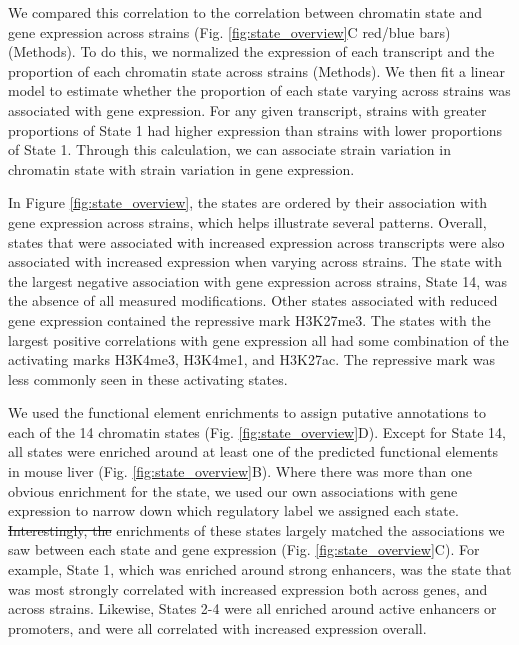 \documentclass[
  11pt,
]{article}
\providecommand{\DIFaddtex}[1]{{\protect\color{blue}\uwave{#1}}} %
\providecommand{\DIFdeltex}[1]{{\protect\color{red}\sout{#1}}}                      %
\providecommand{\DIFaddbegin}{} %
\providecommand{\DIFaddend}{} %
\providecommand{\DIFdelbegin}{} %
\providecommand{\DIFdelend}{} %
\providecommand{\DIFadd}[1]{\texorpdfstring{\DIFaddtex{#1}}{#1}} %
\providecommand{\DIFdel}[1]{\texorpdfstring{\DIFdeltex{#1}}{}} %
\newcommand{\DIFscaledelfig}{0.5}
\newlength{\DIFdelgraphicswidth} %
\newlength{\DIFdelgraphicsheight} %
\newcommand{\DIFaddincludegraphics}[2][]{{\color{blue}\fbox{\DIFOincludegraphics[#1]{#2}}}} %
\newcommand{\DIFdelincludegraphics}[2][]{%
\sbox{\DIFdelgraphicsbox}{\DIFOincludegraphics[#1]{#2}}%
\settoboxwidth{\DIFdelgraphicswidth}{\DIFdelgraphicsbox} %
\settoboxtotalheight{\DIFdelgraphicsheight}{\DIFdelgraphicsbox} %
\scalebox{\DIFscaledelfig}{%
\parbox[b]{\DIFdelgraphicswidth}{\usebox{\DIFdelgraphicsbox}\\[-\baselineskip] \rule{\DIFdelgraphicswidth}{0em}}\llap{\resizebox{\DIFdelgraphicswidth}{\DIFdelgraphicsheight}{%
\setlength{\unitlength}{\DIFdelgraphicswidth}%
\begin{picture}(1,1)%
\thicklines\linethickness{2pt} %
{\color[rgb]{1,0,0}\put(0,0){\framebox(1,1){}}}%
{\color[rgb]{1,0,0}\put(0,0){\line( 1,1){1}}}%
{\color[rgb]{1,0,0}\put(0,1){\line(1,-1){1}}}%
\end{picture}%
}\hspace*{3pt}}} %
} %
\DeclareRobustCommand{\DIFaddbegin}{\DIFOaddbegin \let\includegraphics\DIFaddincludegraphics} %
\DeclareRobustCommand{\DIFaddend}{\DIFOaddend \let\includegraphics\DIFOincludegraphics} %
\DeclareRobustCommand{\DIFdelbegin}{\DIFOdelbegin \let\includegraphics\DIFdelincludegraphics} %
\DeclareRobustCommand{\DIFdelend}{\DIFOaddend \let\includegraphics\DIFOincludegraphics} %
\begin{document}
We compared this correlation to the correlation between chromatin state
and gene expression across strains (Fig. \ref{fig:state_overview}C
red/blue bars) (Methods). To do this, we normalized the expression of
each transcript and the proportion of each chromatin state across
strains (Methods). We then fit a linear model to estimate whether the
proportion of each state varying across strains was associated with gene
expression. For any given transcript, strains with greater proportions
of State 1 had higher expression than strains with lower proportions of
State 1. Through this calculation, we can associate strain variation in
chromatin state with strain variation in gene expression.

In Figure \ref{fig:state_overview}, the states are ordered by their
association with gene expression across strains, which helps illustrate
several patterns. Overall, states that were associated with increased
expression across transcripts were also associated with increased
expression when varying across strains. The state with the largest
negative association with gene expression across strains, State 14, was
the absence of all measured modifications. Other states associated with
reduced gene expression contained the repressive mark H3K27me3. The
states with the largest positive correlations with gene expression all
had some combination of the activating marks H3K4me3, H3K4me1, and
H3K27ac. The repressive mark was less commonly seen in these activating
states.

We used the functional element enrichments to assign putative
annotations to each of the 14 chromatin states (Fig.
\ref{fig:state_overview}D). Except for State 14, all states were
enriched around at least one of the predicted functional elements in
mouse liver (Fig. \ref{fig:state_overview}B). Where there was more than
one obvious enrichment for the state, we used our own associations with
gene expression to narrow down which regulatory label we assigned each
state. \DIFdelbegin \DIFdel{Interestingly, the }\DIFdelend \DIFaddbegin \DIFadd{The }\DIFaddend enrichments of these states largely matched the associations
we saw between each state and gene expression (Fig.
\ref{fig:state_overview}C). For example, State 1, which was enriched
around strong enhancers, was the state that was most strongly correlated
with increased expression both across genes, and across strains.
Likewise, States 2-4 were all enriched around active enhancers or
promoters, and were all correlated with increased expression overall.
\end{document}
